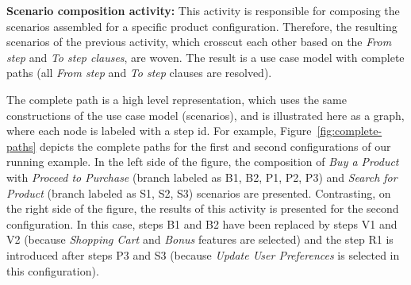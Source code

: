 \documentclass{acm_proc_article-sp}
\begin{document}
 {\bf Scenario composition activity:} This activity is responsible for composing the scenarios assembled for a specific product configuration. 
Therefore, the resulting scenarios of the previous activity, which crosscut each other based on the \emph{From step} and \emph{To step clauses}, are woven. The 
 result is a use case model with complete paths (all \emph{From step} and \emph{To step} clauses are resolved).
 
 
The complete path is a high level representation, which uses the same constructions of the use case model (scenarios), and is illustrated here as a graph, where each node is labeled with a step id. For example, Figure~\ref{fig:complete-paths} depicts the complete paths for the first and second configurations of our running example. In the left side of the figure,  the composition of \emph{Buy a Product} with \emph{Proceed to Purchase} (branch labeled as B1, B2, P1, P2, P3) and \emph{Search for Product} (branch labeled as S1, S2, S3) scenarios are presented. Contrasting, on the right side of the figure, the results of this activity is presented for the second configuration. In this case, steps B1 and B2 have been replaced by steps V1 and V2 (because \emph{Shopping Cart} and \emph{Bonus} features are selected) and the step  R1 is introduced after steps P3 and S3 (because \emph{Update User Preferences} is selected in this configuration).
 
 


\end{document}
